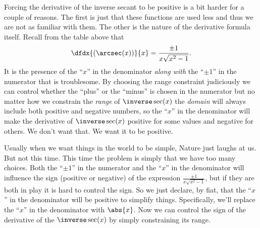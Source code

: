 
Forcing the derivative of the inverse secant to be positive is a bit
harder for a couple of reasons. The first is just that these functions
are used less and thus we are not as familiar with them.  The other is
the nature of the derivative formula itself. Recall from the
table above that
$$
\dfdx{(\arcsec(x))}{x}=\frac{\pm1}{x\sqrt{x^2-1}}.
$$
It is the presence of the ``$x$'' in the denominator \emph{along with} the
``$\pm1$'' in the numerator that is troublesome. By choosing the range
constraint judiciously we can control
whether the ``plus'' or the ``minus'' is chosen in the numerator but
no matter how we constrain the \emph{range} of $\inverse\sec(x)$ the
\emph{domain} will always include both positive and negative numbers,
so the ``$x$'' in the denominator will make the derivative of
$\inverse\sec(x)$ positive for some values and negative for others. We
don't want that. We want it 
to be positive.

Usually when we want things in the world to be simple, Nature just
laughs at us. But not this time. This time the problem is simply that
we have too many choices.  Both the ``$\pm1$'' in the numerator and
the ``$x$'' in the denominator will influence the sign (positive or
negative) of the expression $\frac{\pm1}{x\sqrt{x^2-1}}$, but if they
are both in play it is hard to control the sign. So we just declare,
by fiat, that the ``$x$'' in the denominator will be positive to
simplify things.  Specifically, we'll replace the ``$x$'' in the
denominator with $\abs{x}$. Now we can control the sign of the
derivative of the $\inverse\sec(x)$ by simply constraining its range.

